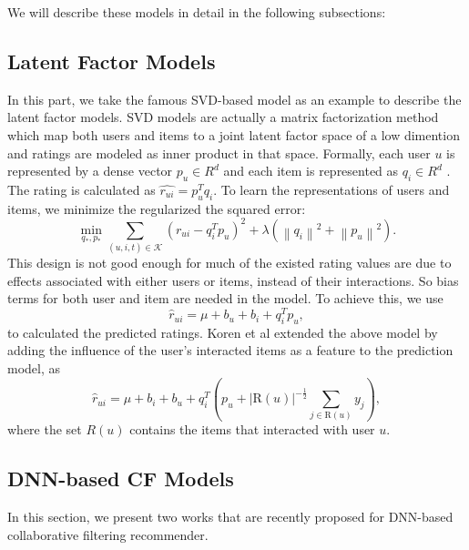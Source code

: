 We will describe these models in detail in the following subsections:
\subsection{Latent Factor Models}
In this part, we take the famous SVD-based model as an example to describe
the latent factor models.
SVD models are actually a matrix factorization method which map both users 
and items to a joint latent factor space of a low dimention and ratings are
modeled as inner product in that space. Formally, each user $u$ is represented
by a dense vector $p_u \in R^d$ and each item is represented as $q_i \in R^d$
. The rating is calculated as $\hat{r_{ui}} = p_u^T q_i$. To learn the representations
of users and items, we minimize the regularized the squared error:
\begin{equation}
    \min _{q_{*}, p_{*}} \sum_{(u, i, t) \in \mathcal{K}}\left(r_{u i}-q_{i}^{T} p_{u}\right)^{2}+\lambda\left(\left\|q_{i}\right\|^{2}+\left\|p_{u}\right\|^{2}\right).
\end{equation}
This design is not good enough for much of the existed rating values 
are due to effects associated with either users or items, instead of 
their interactions. So bias terms for both user and item are needed in the model.
To achieve this, we use 
\begin{equation}
        \hat{r}_{u i}=\mu+b_{u}+b_{i}+q_{i}^{T} p_{u},
\end{equation}
to calculated the predicted ratings.
Koren et al\cite{koren2008factorization} extended the above model by adding the influence
of the user's interacted items as a feature to the prediction model, as
\begin{equation}
    \hat{r}_{u i}=\mu+b_{i}+b_{u}+q_{i}^{T}\left(p_{u}+|\mathrm{R}(u)|^{-\frac{1}{2}} \sum_{j \in \mathrm{R}(u)} y_{j}\right),
\end{equation}
where the set $R(u)$ contains the items that interacted with user $u$.


\subsection{DNN-based CF Models}
In this section, we present two works that are recently proposed for DNN-based
collaborative filtering recommender.

